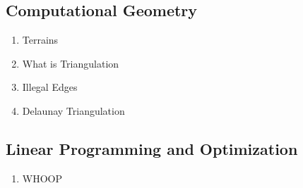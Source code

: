 \subsection{Computational Geometry}
\begin{enumerate}
  \item Terrains
  \item What is Triangulation
  \item Illegal Edges
  \item Delaunay Triangulation
\end{enumerate}
\newpage

\subsection{Linear Programming and Optimization}
\begin{enumerate}
  \item WHOOP
\end{enumerate}
\newpage
